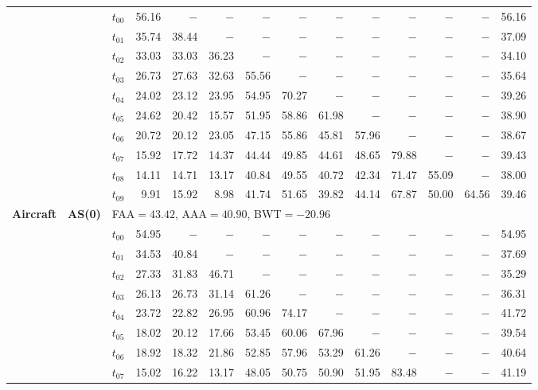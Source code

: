 \begin{table}[ht]
\begin{tabular}{@{}l l l *{11}{r}@{}}
 & & $t_{00}$ & 56.16 & $-$ & $-$ & $-$ & $-$ & $-$ & $-$ & $-$ & $-$ & $-$ & 56.16 \\
 & & $t_{01}$ & 35.74 & 38.44 & $-$ & $-$ & $-$ & $-$ & $-$ & $-$ & $-$ & $-$ & 37.09 \\
 & & $t_{02}$ & 33.03 & 33.03 & 36.23 & $-$ & $-$ & $-$ & $-$ & $-$ & $-$ & $-$ & 34.10 \\
 & & $t_{03}$ & 26.73 & 27.63 & 32.63 & 55.56 & $-$ & $-$ & $-$ & $-$ & $-$ & $-$ & 35.64 \\
 & & $t_{04}$ & 24.02 & 23.12 & 23.95 & 54.95 & 70.27 & $-$ & $-$ & $-$ & $-$ & $-$ & 39.26 \\
 & & $t_{05}$ & 24.62 & 20.42 & 15.57 & 51.95 & 58.86 & 61.98 & $-$ & $-$ & $-$ & $-$ & 38.90 \\
 & & $t_{06}$ & 20.72 & 20.12 & 23.05 & 47.15 & 55.86 & 45.81 & 57.96 & $-$ & $-$ & $-$ & 38.67 \\
 & & $t_{07}$ & 15.92 & 17.72 & 14.37 & 44.44 & 49.85 & 44.61 & 48.65 & 79.88 & $-$ & $-$ & 39.43 \\
 & & $t_{08}$ & 14.11 & 14.71 & 13.17 & 40.84 & 49.55 & 40.72 & 42.34 & 71.47 & 55.09 & $-$ & 38.00 \\
 & & $t_{09}$ & 9.91 & 15.92 & 8.98 & 41.74 & 51.65 & 39.82 & 44.14 & 67.87 & 50.00 & 64.56 & 39.46 \\
\midrule
\multirow{11}{*}{\textbf{Aircraft}} & \multirow{11}{*}{\textbf{AS(0)}} & \multicolumn{12}{l}{\quad\small FAA$=43.42$,\; AAA$=40.90$,\; BWT$=-20.96$} \\
 & & $t_{00}$ & 54.95 & $-$ & $-$ & $-$ & $-$ & $-$ & $-$ & $-$ & $-$ & $-$ & 54.95 \\
 & & $t_{01}$ & 34.53 & 40.84 & $-$ & $-$ & $-$ & $-$ & $-$ & $-$ & $-$ & $-$ & 37.69 \\
 & & $t_{02}$ & 27.33 & 31.83 & 46.71 & $-$ & $-$ & $-$ & $-$ & $-$ & $-$ & $-$ & 35.29 \\
 & & $t_{03}$ & 26.13 & 26.73 & 31.14 & 61.26 & $-$ & $-$ & $-$ & $-$ & $-$ & $-$ & 36.31 \\
 & & $t_{04}$ & 23.72 & 22.82 & 26.95 & 60.96 & 74.17 & $-$ & $-$ & $-$ & $-$ & $-$ & 41.72 \\
 & & $t_{05}$ & 18.02 & 20.12 & 17.66 & 53.45 & 60.06 & 67.96 & $-$ & $-$ & $-$ & $-$ & 39.54 \\
 & & $t_{06}$ & 18.92 & 18.32 & 21.86 & 52.85 & 57.96 & 53.29 & 61.26 & $-$ & $-$ & $-$ & 40.64 \\
 & & $t_{07}$ & 15.02 & 16.22 & 13.17 & 48.05 & 50.75 & 50.90 & 51.95 & 83.48 & $-$ & $-$ & 41.19 \\

\end{tabular}
\end{table}
